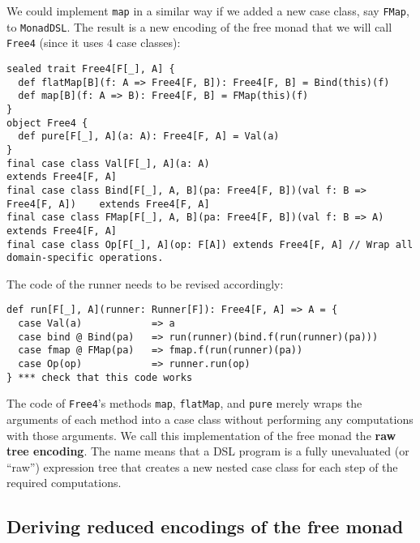 We could implement \lstinline!map!
in a similar way if we added a new case class, say \lstinline!FMap!,
to \lstinline!MonadDSL!.
The result is a new encoding of the free monad that we will call \lstinline!Free4!
(since it uses $4$ case classes):
\begin{lstlisting}
sealed trait Free4[F[_], A] {
  def flatMap[B](f: A => Free4[F, B]): Free4[F, B] = Bind(this)(f)
  def map[B](f: A => B): Free4[F, B] = FMap(this)(f)
}
object Free4 {
  def pure[F[_], A](a: A): Free4[F, A] = Val(a)
}
final case class Val[F[_], A](a: A)                                            extends Free4[F, A]
final case class Bind[F[_], A, B](pa: Free4[F, B])(val f: B => Free4[F, A])    extends Free4[F, A]
final case class FMap[F[_], A, B](pa: Free4[F, B])(val f: B => A)              extends Free4[F, A]
final case class Op[F[_], A](op: F[A]) extends Free4[F, A] // Wrap all domain-specific operations.
\end{lstlisting}
The code of the runner needs to be revised accordingly:
\begin{lstlisting}
def run[F[_], A](runner: Runner[F]): Free4[F, A] => A = {
  case Val(a)            => a
  case bind @ Bind(pa)   => run(runner)(bind.f(run(runner)(pa)))
  case fmap @ FMap(pa)   => fmap.f(run(runner)(pa))
  case Op(op)            => runner.run(op)
} *** check that this code works
\end{lstlisting}
The code of \lstinline!Free4!\textsf{'}s
methods \lstinline!map!,
\lstinline!flatMap!, and
\lstinline!pure! merely
wraps the arguments of each method into a case class without performing
any computations with those arguments. We call this implementation
of the free monad the \textbf{raw tree encoding}.
The name means that a DSL program is a fully unevaluated (or \textsf{``}raw\textsf{''})
expression tree that creates a new nested case class for each step
of the required computations.

\subsection{Deriving reduced encodings of the free monad}

